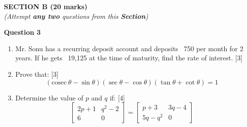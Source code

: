 \newpage
\begin{center}
   \large
   \textbf{SECTION B (20 marks)}\\
   \vspace{5mm}
   \normalsize
   \textit{(Attempt \textbf{any two} questions from this \textbf{Section})}
\end{center}
\par

\noindent
\textbf{Question 3}
\begin{enumerate}[label=(\roman*)]

    \item Mr. Sonu has a recurring deposit account and 
        deposits \rupee~750 per month for 2 years. If he gets
        \rupee~19,125 at the time of maturity, find the rate 
        of interest. \hfill [3]

    \item Prove that: \hfill [3]
        \[
            (\mathrm{cosec} \ \theta - \sin \theta)
            (\sec \theta - \cos \theta)
            (\tan \theta + \cot \theta) = 1
        \]

    \item Determine the value of $p$ and $q$ if: \hfill [4]
        \[
            \begin{bmatrix*} 2p+1  & q^2-2 \\ 6 & 0 \end{bmatrix*} = 
            \begin{bmatrix*} p+3  & 3q-4 \\ 5q-q^2 & 0 \end{bmatrix*}
        \]

\end{enumerate}

